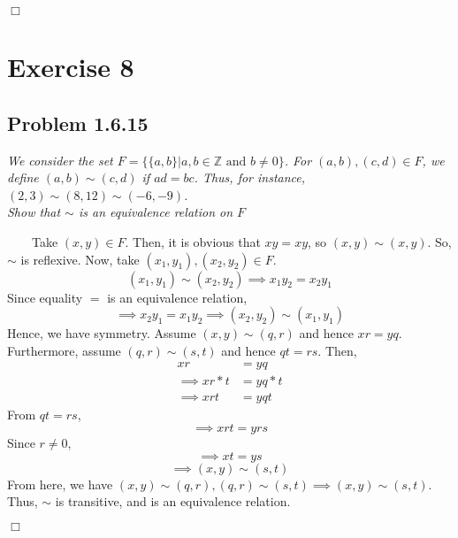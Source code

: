 \documentclass[
]{article}
\begin{document}
\hfill \(\Box\)

\hypertarget{exercise-8}{%
\section{Exercise 8}\label{exercise-8}}

\hypertarget{problem-1.6.15}{%
\subsection{Problem 1.6.15}\label{problem-1.6.15}}

\emph{We consider the set
\(F = \{\{a, b\}|a, b\in \mathbb{Z} \text{ and }b \neq 0\}\). For
\((a,b),(c,d) \in F\), we define \((a,b) \sim (c,d)\) if \(ad = bc\).
Thus, for instance, \((2,3) \sim (8, 12) \sim (-6, -9)\).}\\
\emph{Show that \(\sim\) is an equivalence relation on \(F\)}

~~~~Take \((x, y) \in F\). Then, it is obvious that \(xy = xy\), so
\((x, y) \sim (x, y)\). So, \(\sim\) is reflexive. Now, take
\((x_1, y_1), (x_2, y_2) \in F\).
\[(x_1, y_1) \sim (x_2, y_2) \implies x_1y_2 = x_2y_1\] Since equality
\(=\) is an equivalence relation,
\[\implies x_2y_1=x_1y_2 \implies (x_2, y_2) \sim (x_1, y_1)\] Hence, we
have symmetry. Assume \((x, y) \sim (q, r)\) and hence \(xr = yq\).
Furthermore, assume \((q,r) \sim (s,t)\) and hence \(qt = rs\). Then,
\[ \begin{aligned} xr &= yq \\
\implies xr * t &= yq * t \\
\implies xrt &= yqt \end{aligned} \] From \(qt = rs\),
\[\implies xrt = yrs\] Since \(r \neq 0\), \[\implies xt = ys\]
\[\implies (x, y) \sim (s, t)\] From here, we have
\((x, y) \sim (q, r), (q, r) \sim (s, t) \implies (x, y) \sim (s, t)\).
Thus, \(\sim\) is transitive, and is an equivalence relation.

\hfill \(\Box\)
\end{document}
